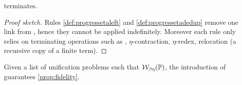 \begin{lemma} \label{lemma:prog-eta-terminates}
   terminates.
\end{lemma}

\begin{proof}[Proof sketch]
  Rules \cref{def:progressetaleft} and
  \cref{def:progressetadedup} remove one link from \linkStore, hence they
  cannot be applied indefinitely.
  Moreover each rule only relies on terminating operations such as \Ue,
  $\eta$-contraction, $\eta$-redex, relocation (a recursive copy of a
  finite term).
\end{proof}  

\begin{theorem} \label{lemma:fidelity-maybeeta}
  Given a list of unification problems \foUnifPb such that
  $\mathcal{W}_{\beta \eta}(\mathbb{P})$, 
  the introduction 
  of \linketa guarantees \cref{prop:fidelity}.
\end{theorem}


